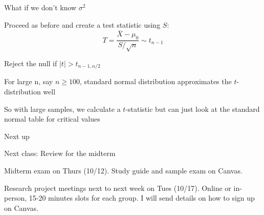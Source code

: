 \documentclass{./../div_teaching_slides}
\begin{document}
\begin{frame}{What if we don't know $\sigma^2$}
\begin{witemize}
  \item Proceed as before and create a test statistic using $S$:
 $$ T = \frac{\bar{X}-\mu_0}{S/\sqrt{n}} \sim t_{n-1} $$ 
\item Reject the null if $|t|> t_{n-1, \alpha/2}$
\item For large n, say $n \geq 100$, standard normal distribution approximates the $t$-distribution well
\item So with large samples, we calculate a $t$-statistic but can just look at the standard normal table for critical values
\end{witemize}
\end{frame}

\begin{frame}{Next up}
\vspace{-0.5em}
\begin{witemize}
  \item Next class: Review for the midterm
  \item Midterm exam on Thurs (10/12). Study guide and sample exam on Canvas.
 \item Research project meetings next to next week on Tues (10/17). Online or in-person, 15-20 minutes slots for each group. I will send details on how to sign up on Canvas. 
\end{witemize}
\end{frame}
\end{document}
